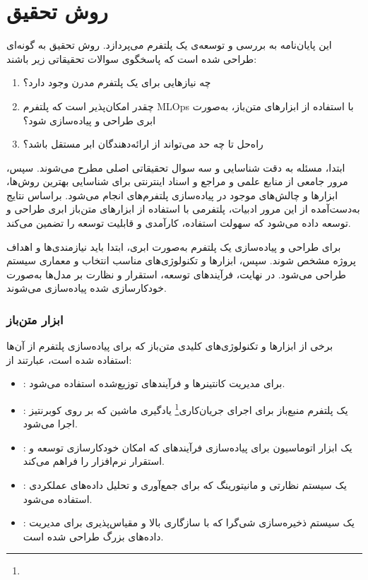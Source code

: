   
\section{روش تحقیق}
این پایان‌نامه به بررسی و توسعه‌ی یک پلتفرم  می‌پردازد. روش تحقیق به گونه‌ای طراحی شده‌ است که پاسخگوی سوالات تحقیقاتی زیر باشند:

\begin{enumerate}
	\item 
	چه نیازهایی برای یک پلتفرم  مدرن وجود دارد؟
	\item
	چقدر امکان‌پذیر است که پلتفرم MLOps با استفاده از ابزارهای متن‌باز، به‌صورت ابری طراحی و پیاده‌سازی شود؟
	\item 
	راه‌حل تا چه حد می‌تواند از ارائه‌دهندگان ابر مستقل باشد؟
\end{enumerate}

ابتدا، مسئله به دقت شناسایی و سه سوال تحقیقاتی اصلی مطرح می‌شوند. سپس، مرور جامعی از منابع علمی و مراجع و اسناد اینترنتی برای شناسایی بهترین روش‌ها، ابزارها و چالش‌های موجود در پیاده‌سازی پلتفرم‌های  انجام می‌شود. براساس نتایج به‌دست‌آمده از این مرور ادبیات، پلتفرمی با استفاده از ابزارهای متن‌باز ابری طراحی و توسعه داده می‌شود که سهولت استفاده، کارآمدی و قابلیت توسعه را تضمین می‌کند. 

برای طراحی و پیاده‌سازی یک پلتفرم  به‌صورت ابری، ابتدا باید نیازمندی‌ها و اهداف پروژه مشخص شوند. سپس، ابزارها و تکنولوژی‌های مناسب انتخاب و معماری سیستم طراحی می‌شود. در نهایت، فرآیندهای توسعه، استقرار و نظارت بر مدل‌ها به‌صورت خودکارسازی شده پیاده‌سازی می‌شوند.

\subsubsection{ابزار متن‌باز}
برخی از ابزارها و تکنولوژی‌های کلیدی متن‌باز که برای پیاده‌سازی پلتفرم از آن‌ها استفاده شده است، عبارتند از:
\begin{itemize}
	\item 
	:
	برای مدیریت کانتینرها و فرآیندهای توزیع‌شده استفاده می‌شود.
	\item 
	:
	یک پلتفرم منبع‌باز برای اجرای جریان‌کاری\footnote{} یادگیری ماشین که بر روی کوبرنتیز اجرا می‌شود.
	\item 
	:
	یک ابزار اتوماسیون برای پیاده‌سازی فرآیندهای  که امکان خودکارسازی توسعه و استقرار نرم‌افزار را فراهم می‌کند.
	\item 
	:
	یک سیستم نظارتی و مانیتورینگ که برای جمع‌آوری و تحلیل داده‌های عملکردی استفاده می‌شود.
	\item
	:
	یک سیستم ذخیره‌سازی شی‌گرا که با سازگاری بالا و مقیاس‌پذیری برای مدیریت داده‌های بزرگ طراحی شده است.
\end{itemize}

